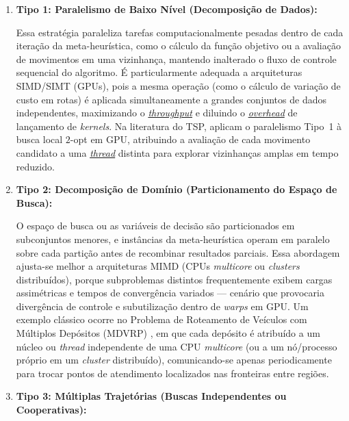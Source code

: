 \begin{enumerate}
      \item \textbf{Tipo 1: Paralelismo de Baixo Nível (Decomposição de Dados):}

            Essa estratégia paraleliza tarefas computacionalmente pesadas dentro de cada iteração da meta-heurística, como o cálculo da função objetivo ou a avaliação de movimentos em uma vizinhança, mantendo inalterado o fluxo de controle sequencial do algoritmo.
            É particularmente adequada a arquiteturas SIMD/SIMT (GPUs), pois a mesma operação (como o cálculo de variação de custo em rotas) é aplicada simultaneamente a grandes conjuntos de dados independentes, maximizando o \hyperlink{term:throughput}{\emph{throughput}} e diluindo o \hyperlink{term:overhead}{\emph{overhead}} de lançamento de \emph{kernels}.
            Na literatura do TSP, \textcite{tsp_gpu} aplicam o paralelismo Tipo~1 à busca local \(2\)-opt em GPU, atribuindo a avaliação de cada movimento candidato a uma \hyperlink{term:thread}{\emph{thread}} distinta para explorar vizinhanças amplas em tempo reduzido.

      \item \textbf{Tipo 2: Decomposição de Domínio (Particionamento do Espaço de Busca):}

            O espaço de busca ou as variáveis de decisão são particionados em subconjuntos menores, e instâncias da meta-heurística operam em paralelo sobre cada partição antes de recombinar resultados parciais.
            Essa abordagem ajusta-se melhor a arquiteturas MIMD (CPUs \emph{multicore} ou \emph{clusters} distribuídos), porque subproblemas distintos frequentemente exibem cargas assimétricas e tempos de convergência variados --- cenário que provocaria divergência de controle e subutilização dentro de \emph{warps} em GPU.
            Um exemplo clássico ocorre no Problema de Roteamento de Veículos com Múltiplos Depósitos (MDVRP) \autocites{crainic2010parallel}{simchi2005logic}, em que cada depósito é atribuído a um núcleo ou \emph{thread} independente de uma CPU \emph{multicore} (ou a um nó/processo próprio em um \emph{cluster} distribuído), comunicando-se apenas periodicamente para trocar pontos de atendimento localizados nas fronteiras entre regiões.

      \item \textbf{Tipo 3: Múltiplas Trajetórias (Buscas Independentes ou Cooperativas):}


\end{enumerate}
